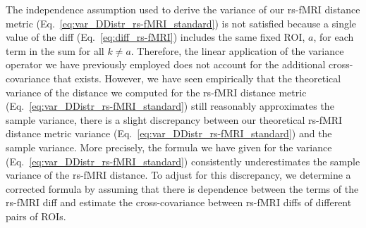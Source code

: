 \documentclass[aos]{imsart}
\begin{document}
The independence assumption used to derive the variance of our rs-fMRI distance metric (Eq.~\ref{eq:var_DDistr_rs-fMRI_standard}) is not satisfied because a single value of the diff (Eq.~\ref{eq:diff_rs-fMRI}) includes the same fixed ROI, $a$, for each term in the sum for all $k \neq a$. Therefore, the linear application of the variance operator we have previously employed does not account for the additional cross-covariance that exists. However, we have seen empirically that the theoretical variance of the distance we computed for the rs-fMRI distance metric (Eq.~\ref{eq:var_DDistr_rs-fMRI_standard}) still reasonably approximates the sample variance, there is a slight discrepancy between our theoretical rs-fMRI distance metric variance (Eq.~\ref{eq:var_DDistr_rs-fMRI_standard}) and the sample variance. More precisely, the formula we have given for the variance (Eq.~\ref{eq:var_DDistr_rs-fMRI_standard}) consistently underestimates the sample variance of the rs-fMRI distance. To adjust for this discrepancy, we determine a corrected formula by assuming that there is dependence between the terms of the rs-fMRI diff and estimate the cross-covariance between rs-fMRI diffs of different pairs of ROIs. 
\end{document}
